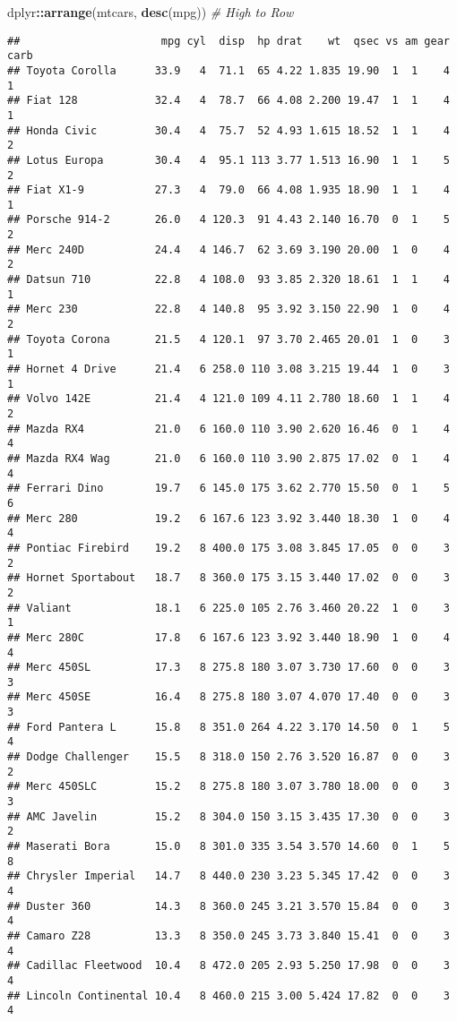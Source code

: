 \documentclass[
]{book}
\newenvironment{Shaded}{\begin{snugshade}}{\end{snugshade}}
\newcommand{\CommentTok}[1]{\textcolor[rgb]{0.56,0.35,0.01}{\textit{#1}}}
\newcommand{\KeywordTok}[1]{\textcolor[rgb]{0.13,0.29,0.53}{\textbf{#1}}}
\newcommand{\NormalTok}[1]{#1}
\newcommand{\OperatorTok}[1]{\textcolor[rgb]{0.81,0.36,0.00}{\textbf{#1}}}
\begin{document}
\begin{Shaded}
\begin{Highlighting}[]
\NormalTok{dplyr}\OperatorTok{::}\KeywordTok{arrange}\NormalTok{(mtcars, }\KeywordTok{desc}\NormalTok{(mpg)) }\CommentTok{\# High to Row}
\end{Highlighting}
\end{Shaded}

\begin{verbatim}
##                      mpg cyl  disp  hp drat    wt  qsec vs am gear carb
## Toyota Corolla      33.9   4  71.1  65 4.22 1.835 19.90  1  1    4    1
## Fiat 128            32.4   4  78.7  66 4.08 2.200 19.47  1  1    4    1
## Honda Civic         30.4   4  75.7  52 4.93 1.615 18.52  1  1    4    2
## Lotus Europa        30.4   4  95.1 113 3.77 1.513 16.90  1  1    5    2
## Fiat X1-9           27.3   4  79.0  66 4.08 1.935 18.90  1  1    4    1
## Porsche 914-2       26.0   4 120.3  91 4.43 2.140 16.70  0  1    5    2
## Merc 240D           24.4   4 146.7  62 3.69 3.190 20.00  1  0    4    2
## Datsun 710          22.8   4 108.0  93 3.85 2.320 18.61  1  1    4    1
## Merc 230            22.8   4 140.8  95 3.92 3.150 22.90  1  0    4    2
## Toyota Corona       21.5   4 120.1  97 3.70 2.465 20.01  1  0    3    1
## Hornet 4 Drive      21.4   6 258.0 110 3.08 3.215 19.44  1  0    3    1
## Volvo 142E          21.4   4 121.0 109 4.11 2.780 18.60  1  1    4    2
## Mazda RX4           21.0   6 160.0 110 3.90 2.620 16.46  0  1    4    4
## Mazda RX4 Wag       21.0   6 160.0 110 3.90 2.875 17.02  0  1    4    4
## Ferrari Dino        19.7   6 145.0 175 3.62 2.770 15.50  0  1    5    6
## Merc 280            19.2   6 167.6 123 3.92 3.440 18.30  1  0    4    4
## Pontiac Firebird    19.2   8 400.0 175 3.08 3.845 17.05  0  0    3    2
## Hornet Sportabout   18.7   8 360.0 175 3.15 3.440 17.02  0  0    3    2
## Valiant             18.1   6 225.0 105 2.76 3.460 20.22  1  0    3    1
## Merc 280C           17.8   6 167.6 123 3.92 3.440 18.90  1  0    4    4
## Merc 450SL          17.3   8 275.8 180 3.07 3.730 17.60  0  0    3    3
## Merc 450SE          16.4   8 275.8 180 3.07 4.070 17.40  0  0    3    3
## Ford Pantera L      15.8   8 351.0 264 4.22 3.170 14.50  0  1    5    4
## Dodge Challenger    15.5   8 318.0 150 2.76 3.520 16.87  0  0    3    2
## Merc 450SLC         15.2   8 275.8 180 3.07 3.780 18.00  0  0    3    3
## AMC Javelin         15.2   8 304.0 150 3.15 3.435 17.30  0  0    3    2
## Maserati Bora       15.0   8 301.0 335 3.54 3.570 14.60  0  1    5    8
## Chrysler Imperial   14.7   8 440.0 230 3.23 5.345 17.42  0  0    3    4
## Duster 360          14.3   8 360.0 245 3.21 3.570 15.84  0  0    3    4
## Camaro Z28          13.3   8 350.0 245 3.73 3.840 15.41  0  0    3    4
## Cadillac Fleetwood  10.4   8 472.0 205 2.93 5.250 17.98  0  0    3    4
## Lincoln Continental 10.4   8 460.0 215 3.00 5.424 17.82  0  0    3    4
\end{verbatim}
\end{document}
